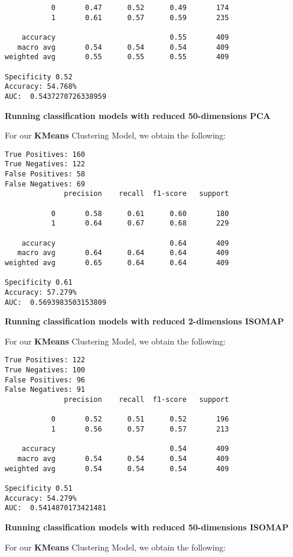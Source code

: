 \documentclass{article}
\begin{document}
\begin{titlepage}
\begin{itemize}
\begin{verbatim}
           0       0.47      0.52      0.49       174
           1       0.61      0.57      0.59       235

    accuracy                           0.55       409
   macro avg       0.54      0.54      0.54       409
weighted avg       0.55      0.55      0.55       409

Specificity 0.52
Accuracy: 54.768%
AUC:  0.5437270726338959
\end{verbatim}



\textbf{Running classification models with reduced 50-dimensions PCA}

For our \textbf{KMeans} Clustering Model, we obtain the following:

\begin{verbatim}
True Positives: 160
True Negatives: 122
False Positives: 58
False Negatives: 69
              precision    recall  f1-score   support

           0       0.58      0.61      0.60       180
           1       0.64      0.67      0.68       229

    accuracy                           0.64       409
   macro avg       0.64      0.64      0.64       409
weighted avg       0.65      0.64      0.64       409

Specificity 0.61
Accuracy: 57.279%
AUC:  0.5693983503153809
\end{verbatim}

\textbf{Running classification models with reduced 2-dimensions ISOMAP}

For our \textbf{KMeans} Clustering Model, we obtain the following:

\begin{verbatim}
True Positives: 122
True Negatives: 100
False Positives: 96
False Negatives: 91
              precision    recall  f1-score   support

           0       0.52      0.51      0.52       196
           1       0.56      0.57      0.57       213

    accuracy                           0.54       409
   macro avg       0.54      0.54      0.54       409
weighted avg       0.54      0.54      0.54       409

Specificity 0.51
Accuracy: 54.279%
AUC:  0.5414870173421481
\end{verbatim}

\textbf{Running classification models with reduced 50-dimensions ISOMAP}

For our \textbf{KMeans} Clustering Model, we obtain the following:


\end{itemize}
\end{titlepage}
\end{document}
